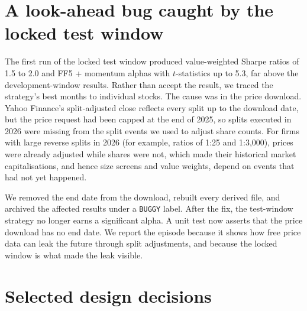 \documentclass[11pt,a4paper]{article}
\begin{document}
\section{A look-ahead bug caught by the locked test window}\label{app:bug}

The first run of the locked test window produced value-weighted Sharpe ratios of 1.5 to 2.0 and FF5 + momentum alphas with
$t$-statistics up to 5.3, far above the development-window results. Rather than accept the result, we traced the
strategy's best months to individual stocks. The cause was in the price download. Yahoo Finance's split-adjusted close
reflects every split up to the download date, but the price request had been capped at the end of 2025, so splits executed
in 2026 were missing from the split events we used to adjust share counts. For firms with large reverse splits in 2026
(for example, ratios of 1:25 and 1:3,000), prices were already adjusted while shares were not, which made their historical
market capitalisations, and hence size screens and value weights, depend on events that had not yet happened.

We removed the end date from the download, rebuilt every derived file, and archived the affected results under a
\texttt{BUGGY} label. After the fix, the test-window strategy no longer earns a significant alpha. A unit test now asserts
that the price download has no end date. We report the episode because it shows how free price data can leak the future
through split adjustments, and because the locked window is what made the leak visible.

\section{Selected design decisions}\label{app:decisions}
\end{document}
